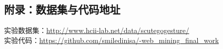 \documentclass[UTF8,a4paper,12pt]{ctexart}
\newcommand{\wuhao}{\fontsize{10.5pt}{10.5pt}\selectfont}
\begin{document}
% 
 




\begin{appendices}
	\section{附录：数据集与代码地址}
	\noindent 实验数据集：\url{http://www.hcii-lab.net/data/scutegogesture/}\\
	\qquad 实验代码：\url{https://github.com/smiledinisa/-web_mining_final_work}
\end{appendices}
\end{document}

